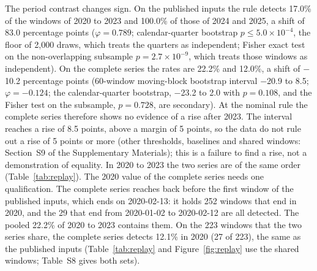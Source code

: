 The period contrast changes sign. On the published inputs the rule detects 17.0\% of the windows of 2020 to 2023 and 100.0\% of those of 2024 and 2025, a shift of 83.0 percentage points ($\varphi=0.789$; calendar-quarter bootstrap $p\le5.0\times10^{-4}$, the floor of 2{,}000 draws, which treats the quarters as independent; Fisher exact test on the non-overlapping subsample $p=2.7\times10^{-9}$, which treats those windows as independent). On the complete series the rates are 22.2\% and 12.0\%, a shift of $-$10.2 percentage points (60-window moving-block bootstrap interval $-$20.9 to 8.5; $\varphi=-0.124$; the calendar-quarter bootstrap, $-$23.2 to 2.0 with $p=0.108$, and the Fisher test on the subsample, $p=0.728$, are secondary). At the nominal rule the complete series therefore shows no evidence of a rise after 2023. The interval reaches a rise of 8.5 points, above a margin of 5 points, so the data do not rule out a rise of 5 points or more (other thresholds, baselines and shared windows: Section~S9 of the Supplementary Materials); this is a failure to find a rise, not a demonstration of equality. In 2020 to 2023 the two series are of the same order (Table~\ref{tab:replay}).
The 2020 value of the complete series needs one qualification. The complete series reaches back before the first window of the published inputs, which ends on 2020-02-13: it holds 252 windows that end in 2020, and the 29 that end from 2020-01-02 to 2020-02-12 are all detected. The pooled 22.2\% of 2020 to 2023 contains them. On the 223 windows that the two series share, the complete series detects 12.1\% in 2020 (27 of 223), the same as the published inputs (Table~\ref{tab:replay} and Figure~\ref{fig:replay} use the shared windows; Table~S8 gives both sets).

